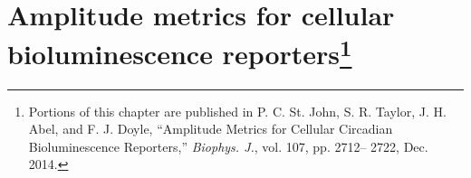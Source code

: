 \chapter[Amplitude metrics for cellular bioluminescence reporters]{Amplitude metrics for cellular bioluminescence reporters\footnote{Portions of this chapter are published in P. C. St. John, S. R. Taylor, J. H. Abel, and F. J. Doyle, ``Amplitude Metrics for Cellular Circadian Bioluminescence Reporters,'' {\itshape Biophys. J.}, vol. 107, pp. 2712– 2722, Dec. 2014.}}

